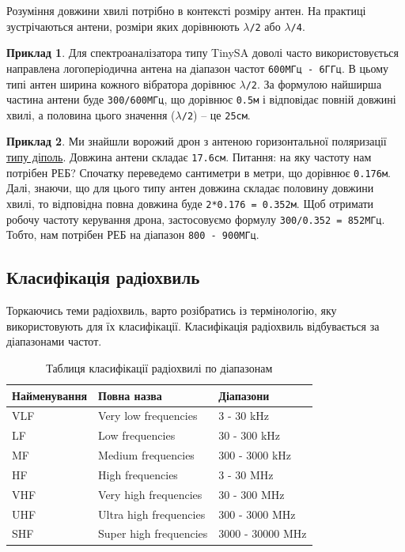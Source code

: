 \documentclass{article}
\begin{document}
Розуміння довжини хвилі потрібно в контексті розміру антен. На практиці зустрічаються антени, розміри яких дорівнюють \texttt{$\lambda$/2} або \texttt{$\lambda$/4}.

\textbf{Приклад 1}. Для спектроаналізатора типу TinySA доволі часто використовується направлена логоперіодична антена на діапазон частот \texttt{600МГц - 6ГГц}. В цьому типі антен ширина кожного вібратора дорівнює \texttt{$\lambda$/2}. За формулою найширша частина антени буде \texttt{300/600МГц}, що дорівнює \texttt{0.5м} і відповідає повній довжині хвилі, а половина цього значення (\texttt{$\lambda$/2}) -- це \texttt{25см}.

\textbf{Приклад 2}. Ми знайшли ворожий дрон з антеною горизонтальної поляризації \href{https://modelistam.com.ua/images/dl-ant-rx60.jpg}{типу діполь}. Довжина антени складає \texttt{17.6см}. Питання: на яку частоту нам потрібен РЕБ? Спочатку переведемо сантиметри в метри, що дорівнює \texttt{0.176м}. Далі, знаючи, що для цього типу антен довжина складає половину довжини хвилі, то відповідна повна довжина буде \texttt{2*0.176 = 0.352м}. Щоб отримати робочу частоту керування дрона, застосовуємо формулу \texttt{300/0.352 = 852МГц}. Тобто, нам потрібен РЕБ на діапазон \texttt{800 - 900МГц}.

\subsection{Класифікація радіохвиль}

Торкаючись теми радіохвиль, варто розібратись із термінологію, яку використовують для їх класифікації. Класифікація радіохвиль відбувається за діапазонами частот.

\begin{table}[ht]
	\centering
	\begin{tabular}{|l|l|l|}
		\hline 
		\textbf{Найменування}  & \textbf{Повна назва} & \textbf{Діапазони} \\
		\hline
		VLF      	& Very low frequencies		& 3 - 30 kHz   		\\
		LF    		& Low frequencies    		& 30 - 300 kHz 		\\
		MF			& Medium frequencies		& 300 - 3000 kHz	\\
		HF    		& High frequencies			& 3 - 30 MHz 		\\
		VHF     	& Very high frequencies 	& 30 - 300 MHz  	\\
		UHF			& Ultra high frequencies	& 300 - 3000 MHz	\\
		SHF			& Super high frequencies	& 3000 - 30000 MHz 	\\
		\hline
	\end{tabular}
	\caption{\label{table:radiowaves_types} Таблиця класифікації радіохвилі по діапазонам}
\end{table}
\end{document}
